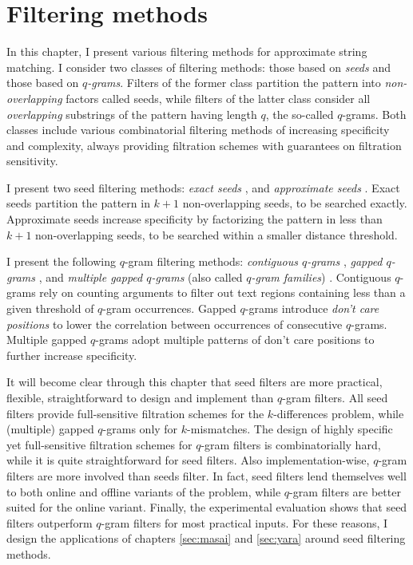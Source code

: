 \chapter{Filtering methods}
\label{sec:filter}

In this chapter, I present various filtering methods for approximate string matching.
I consider two classes of filtering methods: those based on \emph{seeds} and those based on \emph{$q$-grams}.
Filters of the former class partition the pattern into \emph{non-overlapping} factors called seeds, while filters of the latter class consider all \emph{overlapping} substrings of the pattern having length $q$, the so-called $q$-grams.
Both classes include various combinatorial filtering methods of increasing specificity and complexity, always providing filtration schemes with guarantees on filtration sensitivity.

I present two seed filtering methods:
\emph{exact seeds} \citep{Baeza1992}, and
\emph{approximate seeds} \citep{Myers1994,Navarro2000}.
Exact seeds partition the pattern in $k+1$ non-overlapping seeds, to be searched exactly.
Approximate seeds increase specificity by factorizing the pattern in less than $k+1$ non-overlapping seeds, to be searched within a smaller distance threshold.

I present the following $q$-gram filtering methods:
\emph{contiguous $q$-grams} \citep{Jokinen1991},
\emph{gapped $q$-grams} \citep{Burkhardt2001}, and
\emph{multiple gapped $q$-grams} (also called \emph{$q$-gram families}) \citep{Kucherov2005}.
Contiguous $q$-grams rely on counting arguments to filter out text regions containing less than a given threshold of $q$-gram occurrences.
Gapped $q$-grams introduce \emph{don't care positions} to lower the correlation between occurrences of consecutive $q$-grams.
Multiple gapped $q$-grams adopt multiple patterns of don't care positions to further increase specificity.

It will become clear through this chapter that seed filters are more practical, flexible, straightforward to design and implement than $q$-gram filters.
All seed filters provide full-sensitive filtration schemes for the $k$-differences problem, while (multiple) gapped $q$-grams only for $k$-mismatches.
The design of highly specific yet full-sensitive filtration schemes for $q$-gram filters is combinatorially hard, while it is quite straightforward for seed filters.
Also implementation-wise, $q$-gram filters are more involved than seeds filter.
In fact, seed filters lend themselves well to both online and offline variants of the problem, while $q$-gram filters are better suited for the online variant.
Finally, the experimental evaluation shows that seed filters outperform $q$-gram filters for most practical inputs.
For these reasons, I design the applications of chapters \ref{sec:masai} and \ref{sec:yara} around seed filtering methods.

